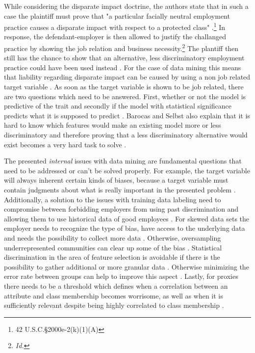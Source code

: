While considering the disparate impact doctrine, the authors state that in such a case 
the plaintiff must prove that "a particular facially neutral employment practice causes 
a disparate impact with respect to a protected class" \cite{Barocas.2016} 
\cite{titleVII}.\footnote{ 42 U.S.C.§2000e-2(k)(1)(A) } In response, the defendant-employer 
is then allowed to justify the challanged practice by showing the job relation and 
business necessity.\footnote{ \textit{Id.} } The plantiff then still has the chance 
to show that an alternative, less discriminatory employment practice could have been 
used instead \cite{Barocas.2016}. For the case of data mining this means that liability 
regarding disparate impact can be caused by using a non job related target variable 
\cite{Barocas.2016}. As soon as the target variable is shown to be job related, there 
are two questions which need to be answered. First, whether or not the model is 
predictive of the trait and secondly if the model with statistical significance 
predicts what it is supposed to predict \cite{Barocas.2016}. Barocas and Selbst 
also explain that it is hard to know which features would make an existing model more
or less discriminatory and therefore proving that a less discriminatory alternative 
would exist becomes a very hard task to solve \cite{Barocas.2016}.

The presented \textit{internal} issues with data mining are fundamental questions that need to be addressed or can't be solved properly. For example, the target variable will always inherent certain kinds of biases, because a target variable must contain judgments about what is really important in the presented problem \cite{Barocas.2016}. Additionally, a solution to the issues with training data labeling need to compromise between forbidding employers from using past discrimination and allowing them to use historical data of good employees \cite{Barocas.2016}. For skewed data sets the employer needs to recognize the type of bias, have access to the underlying data and needs the possibility to collect more data  \cite{Barocas.2016}. Otherwise, oversampling underrepresented communities can clear up some of the bias \cite{Barocas.2016}. Statistical discrimination in the area of feature selection is avoidable if there is the possibility to gather additional or more granular data \cite{Barocas.2016}. Otherwise minimizing the error rate between groups can help to improve this aspect \cite{Barocas.2016}. Lastly, for proxies there needs to be a threshold which defines when a correlation between an attribute and class membership becomes worrisome, as well as when it is sufficiently relevant despite being highly correlated to class membership \cite{Barocas.2016}.

